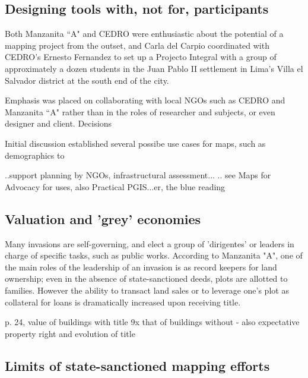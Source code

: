 \documentclass[11pt]{report}
\begin{document}
\subsection{Designing tools with, not for, participants}

Both Manzanita ``A" and CEDRO were enthusiastic about the potential of a mapping project from the outset, and Carla del Carpio coordinated with CEDRO's Ernesto Fernandez to set up a Projecto Integral
with a group of approximately a dozen students in the Juan Pablo II settlement in Lima's Villa el Salvador district at the south end of the city.

Emphasis was placed on collaborating with local NGOs such as CEDRO and Manzanita ``A" rather than in the roles of researcher and subjects, or even designer and client. Decisions 

Initial discussion established several possibe use cases for maps, such as demographics to 

..support planning by NGOs, infrastructural assessment...  
.. see Maps for Advocacy for uses, also Practical PGIS...er, the blue reading

\subsection{Valuation and 'grey' economies}


Many invasions are self-governing, and elect a group of 'dirigentes' or leaders in charge of specific tasks, such as public works. According to Manzanita "A", one of the main roles of the leadership of an invasion is as record keepers for land ownership; even in the absence of state-sanctioned deeds, plots are allotted to families. However the ability to transact land sales or to leverage one's plot as collateral for loans is dramatically increased upon receiving title. 

p. 24, value of buildings with title 9x that of buildings without - also expectative property right and evolution of title

\subsection{Limits of state-sanctioned mapping efforts}

\end{document}
